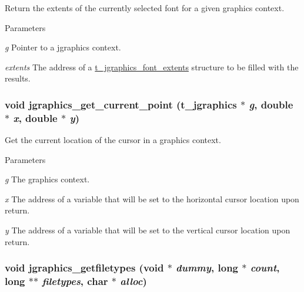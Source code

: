 Return the extents of the currently selected font for a given graphics context. 
\begin{DoxyParams}{Parameters}
\item[{\em g}]Pointer to a jgraphics context. \item[{\em extents}]The address of a \hyperlink{structt__jgraphics__font__extents}{t\_\-jgraphics\_\-font\_\-extents} structure to be filled with the results. \end{DoxyParams}
\hypertarget{group__jgraphics_gae3c2cc2ba52f2a27bf9e09a60fa94daa}{
\subsubsection[{jgraphics\_\-get\_\-current\_\-point}]{\setlength{\rightskip}{0pt plus 5cm}void jgraphics\_\-get\_\-current\_\-point ({\bf t\_\-jgraphics} $\ast$ {\em g}, \/  double $\ast$ {\em x}, \/  double $\ast$ {\em y})}}
\label{group__jgraphics_gae3c2cc2ba52f2a27bf9e09a60fa94daa}


Get the current location of the cursor in a graphics context. 
\begin{DoxyParams}{Parameters}
\item[{\em g}]The graphics context. \item[{\em x}]The address of a variable that will be set to the horizontal cursor location upon return. \item[{\em y}]The address of a variable that will be set to the vertical cursor location upon return. \end{DoxyParams}
\hypertarget{group__jgraphics_ga7a23d1cdfe75bfcdb0415adc6696f4f0}{
\subsubsection[{jgraphics\_\-getfiletypes}]{\setlength{\rightskip}{0pt plus 5cm}void jgraphics\_\-getfiletypes (void $\ast$ {\em dummy}, \/  long $\ast$ {\em count}, \/  long $\ast$$\ast$ {\em filetypes}, \/  char $\ast$ {\em alloc})}}
\label{group__jgraphics_ga7a23d1cdfe75bfcdb0415adc6696f4f0}


